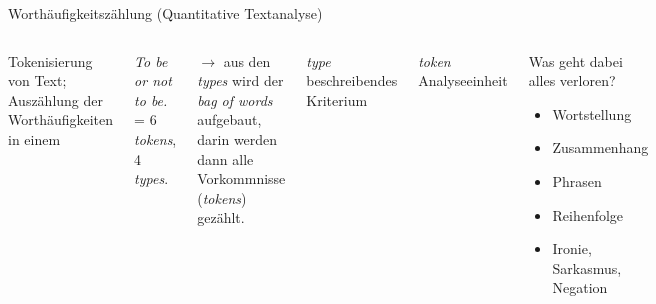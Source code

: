 



\begin{frame}{Worthäufigkeitszählung (Quantitative Textanalyse)}
\begin{columns}
Tokenisierung von Text; Auszählung der Worthäufigkeiten in einem 
\smallskip

\emph{To be or not to be.} \\ = 6 \emph{tokens}, 4 \emph{types}.
\smallskip

$\to$ aus den \emph{types} wird der \emph{bag of words} aufgebaut, darin werden dann alle Vorkommnisse (\emph{tokens}) gezählt.

\begin{block}{\emph{type}}
beschreibendes Kriterium
\end{block}

\begin{block}{\emph{token}}
Analyseeinheit
\end{block}

\begin{block}{Was geht dabei alles verloren?}
\begin{itemize}\footnotesize
    \item Wortstellung
    \item Zusammenhang
    \item Phrasen
    \item Reihenfolge
    \item Ironie, Sarkasmus, Negation
\end{itemize}
\end{block}

\end{columns}
\end{frame}


